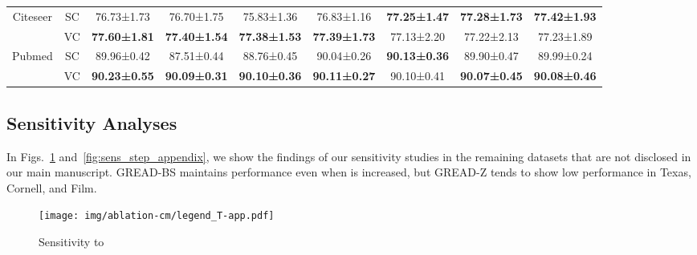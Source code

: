 \documentclass{article}
\theoremstyle{plain}
\theoremstyle{definition}
\theoremstyle{remark}
\newcommand{\std}{\scriptsize{}}
\begin{document}
\begin{table}[h!]
\begin{tabular}{cc cccc ccc}
        \midrule \multirow{2}{*}{Citeseer}
        & SC    &  76.73\std{±1.73} & 76.70\std{±1.75} & 75.83\std{±1.36} & 76.83\std{±1.16} & \textbf{77.25\std{±1.47}} & \textbf{77.28\std{±1.73}} & \textbf{77.42\std{±1.93}} \\
        & VC    &  \textbf{77.60\std{±1.81}} & \textbf{77.40\std{±1.54}} & \textbf{77.38\std{±1.53}} & \textbf{77.39\std{±1.73}} & 77.13\std{±2.20} & 77.22\std{±2.13} & 77.23\std{±1.89} \\ 
        \midrule \multirow{2}{*}{Pubmed}
        & SC    &  89.96\std{±0.42} & 87.51\std{±0.44} & 88.76\std{±0.45} & 90.04\std{±0.26} & \textbf{90.13\std{±0.36}} & 89.90\std{±0.47} & 89.99\std{±0.24} \\ 
        & VC    &  \textbf{90.23\std{±0.55}} & \textbf{90.09\std{±0.31}} & \textbf{90.10\std{±0.36}} & \textbf{90.11\std{±0.27}} & 90.10\std{±0.41} & \textbf{90.07\std{±0.45}} & \textbf{90.08\std{±0.46}} \\
        \bottomrule
     \end{tabular}
 \end{table}

\clearpage
 
\subsection{Sensitivity Analyses}\label{a:sensitivity}
In Figs.~\ref{fig:sens_T_appendix} and~\ref{fig:sens_step_appendix}, we show the findings of our sensitivity studies in the remaining datasets that are not disclosed in our main manuscript. GREAD-BS maintains performance even when  is increased, but GREAD-Z tends to show low performance in Texas, Cornell, and Film.

 \begin{figure}[ht!]
    \centering
\texttt{[image: img/ablation-cm/legend\_T-app.pdf]}\vspace{0.3in}
    \caption{Sensitivity to }
    \label{fig:sens_T_appendix}
\end{figure}
\end{document}
